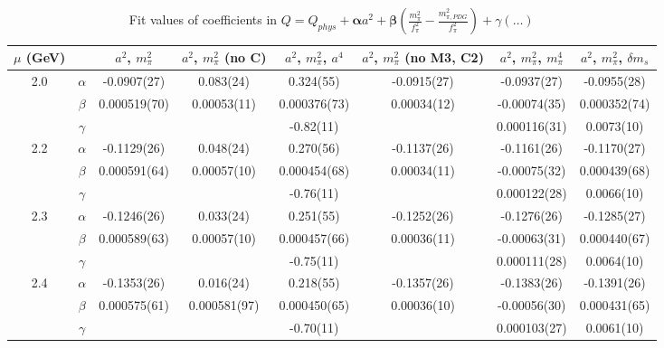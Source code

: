 \documentclass[12pt]{extarticle}
\begin{document}
\begin{table}[h!]
\begin{center}
\begin{tabular}{|c c|c|c|c|c|c|c|}
\hline
$\mu$ (GeV) &  & $a^2$, $m_\pi^2$& $a^2$, $m_\pi^2$ (no C)& $a^2$, $m_\pi^2$, $a^4$& $a^2$, $m_\pi^2$ (no M3, C2)& $a^2$, $m_\pi^2$, $m_\pi^4$& $a^2$, $m_\pi^2$, $\delta m_s$\\
\hline
\multirow{3}{0.5in}{2.0} & $\alpha$ & -0.0907(27)& 0.083(24)& 0.324(55)& -0.0915(27)& -0.0937(27)& -0.0955(28)\\
 & $\beta$ & 0.000519(70)& 0.00053(11)& 0.000376(73)& 0.00034(12)& -0.00074(35)& 0.000352(74)\\
 & $\gamma$ &  &  & -0.82(11)&  & 0.000116(31)& 0.0073(10)\\
\hline
\multirow{3}{0.5in}{2.2} & $\alpha$ & -0.1129(26)& 0.048(24)& 0.270(56)& -0.1137(26)& -0.1161(26)& -0.1170(27)\\
 & $\beta$ & 0.000591(64)& 0.00057(10)& 0.000454(68)& 0.00034(11)& -0.00075(32)& 0.000439(68)\\
 & $\gamma$ &  &  & -0.76(11)&  & 0.000122(28)& 0.0066(10)\\
\hline
\multirow{3}{0.5in}{2.3} & $\alpha$ & -0.1246(26)& 0.033(24)& 0.251(55)& -0.1252(26)& -0.1276(26)& -0.1285(27)\\
 & $\beta$ & 0.000589(63)& 0.00057(10)& 0.000457(66)& 0.00036(11)& -0.00063(31)& 0.000440(67)\\
 & $\gamma$ &  &  & -0.75(11)&  & 0.000111(28)& 0.0064(10)\\
\hline
\multirow{3}{0.5in}{2.4} & $\alpha$ & -0.1353(26)& 0.016(24)& 0.218(55)& -0.1357(26)& -0.1383(26)& -0.1391(26)\\
 & $\beta$ & 0.000575(61)& 0.000581(97)& 0.000450(65)& 0.00036(10)& -0.00056(30)& 0.000431(65)\\
 & $\gamma$ &  &  & -0.70(11)&  & 0.000103(27)& 0.0061(10)\\
\hline
\end{tabular}
\caption{Fit values of coefficients in $Q = Q_{phys} + \mathbf{\alpha} a^2 + \mathbf{\beta}\left(\frac{m_\pi^2}{f_\pi^2}-\frac{m_{\pi,PDG}^2}{f_\pi^2}\right) + \gamma(\ldots)$}
\end{center}
\end{table}





\end{document}
